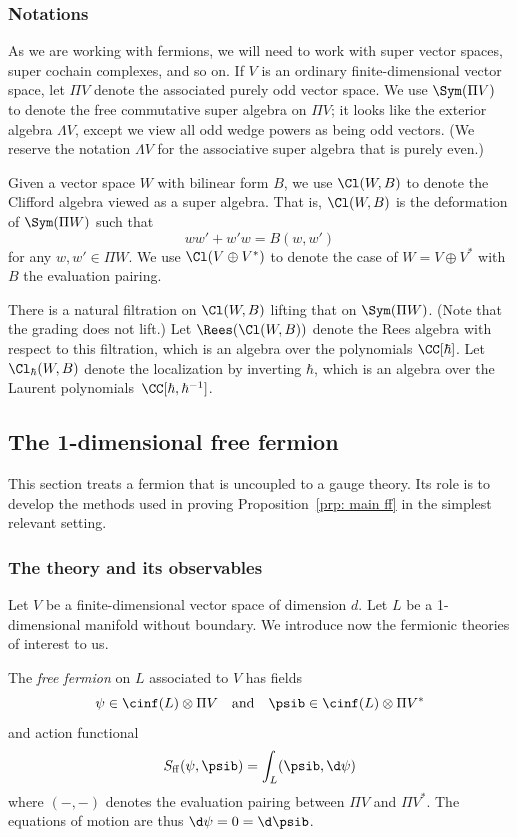 \documentclass[10pt]{amsart}
\begin{document}
\subsubsection{Notations}

As we are working with fermions, we will need to work with super vector spaces, super cochain complexes, and so on.
If $V$ is an ordinary finite-dimensional vector space, 
let $\Pi V$ denote the associated purely odd vector space.
We use $\Sym(\Pi V)$ to denote the free commutative super algebra on $\Pi V$;
it looks like the exterior algebra $\Lambda V$,
except we view all odd wedge powers as being odd vectors.
(We reserve the notation $\Lambda V$ for the associative super algebra that is purely even.) 

Given a vector space $W$ with bilinear form $B$, 
we use $\Cl(W,B)$ to denote the Clifford algebra viewed as a super algebra.
That is, $\Cl(W,B)$ is the deformation of $\Sym(\Pi W)$ such that
\[
w w' + w' w = B(w,w')
\] 
for any $w,w' \in \Pi W$.
We use $\Cl(V \oplus V^*)$ to denote the case of $W = V \oplus V^*$ with $B$ the evaluation pairing.

There is a natural filtration on $\Cl(W,B)$ lifting that on $\Sym(\Pi W)$.
(Note that the grading does not lift.)
Let $\Rees(\Cl(W,B))$ denote the Rees algebra with respect to this filtration,
which is an algebra over the polynomials $\CC[\hbar]$.
Let $\Cl_\hbar(W,B)$ denote the localization by inverting $\hbar$,
which is an algebra over the Laurent polynomials~$\CC[\hbar,\hbar^{-1}]$.

\subsection{The 1-dimensional free fermion}

This section treats a fermion that is uncoupled to a gauge theory.
Its role is to develop the methods used in proving Proposition~\ref{prp: main ff} in the simplest relevant setting.

\subsubsection{The theory and its observables}

Let $V$ be a finite-dimensional vector space of dimension $d$.
Let $L$ be a 1-dimensional manifold without boundary.
We introduce now the fermionic theories of interest to us.

\begin{dfn}
The {\em free fermion} on $L$ associated to $V$ has fields
\[
\psi \in \cinf(L) \otimes \Pi V \quad\text{and}\quad \psib \in \cinf(L) \otimes \Pi V^*
\]
and action functional
\[
S_{\rm ff}(\psi,\psib) = \int_L (\psib, \d \psi)
\]
where $(-,-)$ denotes the evaluation pairing between $\Pi V$ and $\Pi V^*$.
The equations of motion are thus $\d \psi = 0 = \d \psib$.
\end{dfn}
\end{document}

